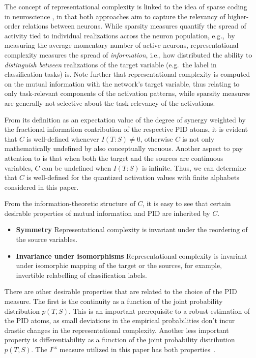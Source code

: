 \documentclass[10pt]{article}
\theoremstyle{definition}
\theoremstyle{plain}
\begin{document}
The concept of representational complexity is linked to the idea of sparse coding in neuroscience \citep{olshausen_sparse_2004}, in that both approaches aim to capture the relevancy of higher-order relations between neurons. While sparsity measures quantify the spread of activity tied to individual realizations across the neuron population, e.g.,~by measuring the average momentary number of active neurons, representational complexity measures the spread of \textit{information}, i.e., how distributed the ability to \textit{distinguish between} realizations of the target variable (e.g.~the label in classification tasks) is. Note further that representational complexity is computed on the mutual information with the network's target variable, thus relating to only task-relevant components of the activation patterns, while sparsity measures are generally not selective about the task-relevancy of the activations.

From its definition as an expectation value of the degree of synergy weighted by the fractional information contribution of the respective PID atoms, it is evident that $C$ is well-defined whenever $I(T:S)\neq 0$, otherwise $C$ is not only mathematically undefined by also conceptually vacuous. Another aspect to pay attention to is that when both the target and the sources are continuous variables, $C$ can be undefined when $I(T: S)$ is infinite. Thus, we can determine that $C$ is well-defined for the quantized activation values with finite alphabets considered in this paper.

From the information-theoretic structure of $C$, it is easy to see that certain desirable properties of mutual information and PID are inherited by $C$. 
\begin{itemize}
    \item {\bf Symmetry} Representational complexity is invariant under the reordering of the source variables. 
    \item {\bf Invariance under isomorphisms} Representational complexity is invariant under isomorphic mapping of the target or the sources, for example, invertible relabelling of classification labels. 
\end{itemize}

There are other desirable properties that are related to the choice of the PID measure. The first is the continuity as a function of the joint probability distribution $p(T,S)$. This is an important prerequisite to a robust estimation of the PID atoms, as small deviations in the empirical probabilities don't incur drastic changes in the representational complexity. Another less important property is differentiability as a function of the joint probability distribution $p(T,S)$. The $I^{\mathrm{sx}}$ measure utilized in this paper has both properties~\citep{makkeh_introducing_2021}. 
\end{document}
